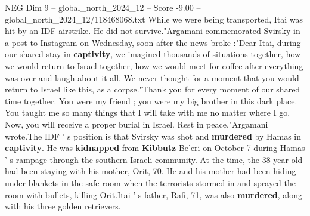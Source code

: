 \begin{textsample}{NEG Dim 9 – global\_north\_2024\_12 – Score -9.00 – global\_north\_2024\_12/118468068.txt}
While we were being transported, Itai was hit by an IDF airstrike.
He did not survive."Argamani commemorated Svirsky in a post to Instagram on Wednesday, soon after the news broke :"Dear Itai, during our shared stay in \textbf{captivity}, we imagined thousands of situations together, how we would return to Israel together, how we would meet for coffee after everything was over and laugh about it all.
We never thought for a moment that you would return to Israel like this, as a corpse."Thank you for every moment of our shared time together.
You were my friend ; you were my big brother in this dark place.
You taught me so many things that I will take with me no matter where I go.
Now, you will receive a proper burial in Israel.
Rest in peace,"Argamani wrote.The IDF ' s position is that Svirsky was shot and \textbf{murdered} by Hamas in \textbf{captivity}.
He was \textbf{kidnapped} from \textbf{Kibbutz} Be'eri on October 7 during Hamas ' s rampage through the southern Israeli community.
At the time, the 38-year-old had been staying with his mother, Orit, 70.
He and his mother had been hiding under blankets in the safe room when the terrorists stormed in and sprayed the room with bullets, killing Orit.Itai ' s father, Rafi, 71, was also \textbf{murdered}, along with his three golden retrievers.

\end{textsample}
